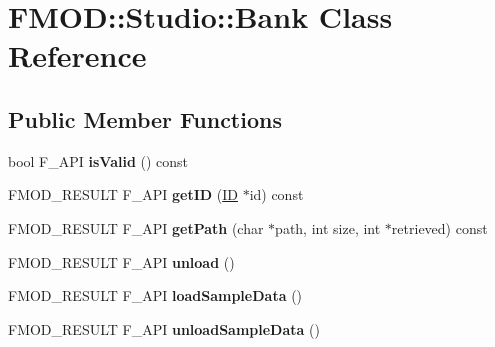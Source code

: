\hypertarget{class_f_m_o_d_1_1_studio_1_1_bank}{\section{F\+M\+O\+D\+:\+:Studio\+:\+:Bank Class Reference}
\label{class_f_m_o_d_1_1_studio_1_1_bank}
}
\subsection*{Public Member Functions}
\begin{DoxyCompactItemize}
\item 
\hypertarget{class_f_m_o_d_1_1_studio_1_1_bank_aac9ae83584c41cd95ac8a3103f44f599}{bool F\+\_\+\+A\+P\+I {\bfseries is\+Valid} () const }\label{class_f_m_o_d_1_1_studio_1_1_bank_aac9ae83584c41cd95ac8a3103f44f599}

\item 
\hypertarget{class_f_m_o_d_1_1_studio_1_1_bank_ad221b46a8b195920b0736eb0e88d90e6}{F\+M\+O\+D\+\_\+\+R\+E\+S\+U\+L\+T F\+\_\+\+A\+P\+I {\bfseries get\+I\+D} (\hyperlink{struct_f_m_o_d___g_u_i_d}{I\+D} $\ast$id) const }\label{class_f_m_o_d_1_1_studio_1_1_bank_ad221b46a8b195920b0736eb0e88d90e6}

\item 
\hypertarget{class_f_m_o_d_1_1_studio_1_1_bank_a48bcbdad67350d113519d0adc0898275}{F\+M\+O\+D\+\_\+\+R\+E\+S\+U\+L\+T F\+\_\+\+A\+P\+I {\bfseries get\+Path} (char $\ast$path, int size, int $\ast$retrieved) const }\label{class_f_m_o_d_1_1_studio_1_1_bank_a48bcbdad67350d113519d0adc0898275}

\item 
\hypertarget{class_f_m_o_d_1_1_studio_1_1_bank_a994ccae786aad7e7cf5d470882d5bb62}{F\+M\+O\+D\+\_\+\+R\+E\+S\+U\+L\+T F\+\_\+\+A\+P\+I {\bfseries unload} ()}\label{class_f_m_o_d_1_1_studio_1_1_bank_a994ccae786aad7e7cf5d470882d5bb62}

\item 
\hypertarget{class_f_m_o_d_1_1_studio_1_1_bank_aeb5c956cc80cbf454971319918fe4cca}{F\+M\+O\+D\+\_\+\+R\+E\+S\+U\+L\+T F\+\_\+\+A\+P\+I {\bfseries load\+Sample\+Data} ()}\label{class_f_m_o_d_1_1_studio_1_1_bank_aeb5c956cc80cbf454971319918fe4cca}

\item 
\hypertarget{class_f_m_o_d_1_1_studio_1_1_bank_a757a10c5680e9a8ab8529f39ef205754}{F\+M\+O\+D\+\_\+\+R\+E\+S\+U\+L\+T F\+\_\+\+A\+P\+I {\bfseries unload\+Sample\+Data} ()}\label{class_f_m_o_d_1_1_studio_1_1_bank_a757a10c5680e9a8ab8529f39ef205754}


\end{DoxyCompactItemize}
